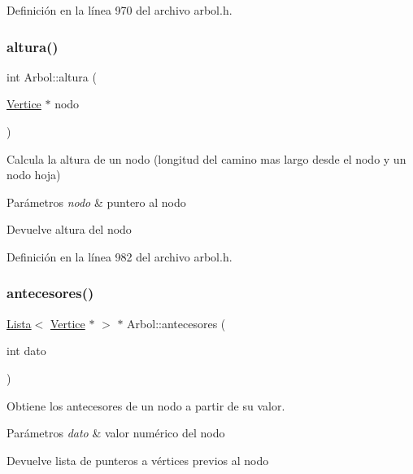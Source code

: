 Definición en la línea 970 del archivo arbol.\+h.

\mbox{\label{classArbol_a9f8928b4c72e2d484ef75cf3633c22ce}} 
\subsubsection{\texorpdfstring{altura()}{altura()}\hspace{0.1cm}{\footnotesize\ttfamily [3/3]}}
{\footnotesize\ttfamily int Arbol\+::altura (\begin{DoxyParamCaption}\item[{\hyperlink{classVertice}{Vertice} $\ast$}]{nodo }\end{DoxyParamCaption})}



Calcula la altura de un nodo (longitud del camino mas largo desde el nodo y un nodo hoja) 


\begin{DoxyParams}{Parámetros}
{\em nodo} & puntero al nodo \\
\hline
\end{DoxyParams}
\begin{DoxyReturn}{Devuelve}
altura del nodo 
\end{DoxyReturn}


Definición en la línea 982 del archivo arbol.\+h.

\mbox{\label{classArbol_ac7ff5e2f436a1e83e24cbdd0b2cc827b}} 
\subsubsection{\texorpdfstring{antecesores()}{antecesores()}\hspace{0.1cm}{\footnotesize\ttfamily [1/2]}}
{\footnotesize\ttfamily \hyperlink{classLista}{Lista}$<$ \hyperlink{classVertice}{Vertice} $\ast$ $>$ $\ast$ Arbol\+::antecesores (\begin{DoxyParamCaption}\item[{int}]{dato }\end{DoxyParamCaption})}



Obtiene los antecesores de un nodo a partir de su valor. 


\begin{DoxyParams}{Parámetros}
{\em dato} & valor numérico del nodo \\
\hline
\end{DoxyParams}
\begin{DoxyReturn}{Devuelve}
lista de punteros a vértices previos al nodo 
\end{DoxyReturn}


